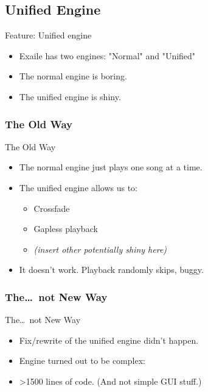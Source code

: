 \documentclass{beamer}
\begin{document}
\subsection{Unified Engine}

\begin{frame}{Feature: Unified engine}
  \begin{itemize}
    \item Exaile has two engines: "Normal" and "Unified"
	\item The normal engine is boring.
	\item The unified engine is shiny.
  \end{itemize}
\end{frame}

\subsubsection{The Old Way}
\begin{frame}{The Old Way}
  \begin{itemize}
    \item The normal engine just plays one song at a time.
	\item The unified engine allows us to:
	  \begin{itemize}
	    \item Crossfade
		\item Gapless playback
		\item \textit{(insert other potentially shiny here)}
      \end{itemize}
	\item It doesn't work. Playback randomly skips, buggy.
  \end{itemize}
\end{frame}

\subsubsection{The\ldots\ not New Way}
\begin{frame}{The\ldots\ not New Way}
  \begin{itemize}
    \item Fix/rewrite of the unified engine didn't happen.
	\item Engine turned out to be complex:
	\item \textgreater 1500 lines of code. (And not simple GUI stuff.)
  \end{itemize}
\end{frame}
\end{document}
